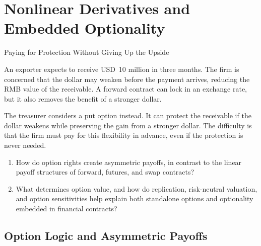 \chapter{Nonlinear Derivatives and Embedded Optionality}
\label{chap:Nonlinear_Derivatives_and_Embedded_Optionality}

\begin{openingcase}{Paying for Protection Without Giving Up the Upside}

An exporter expects to receive USD~10 million in three months. The firm is concerned that the dollar may weaken before the payment arrives, reducing the RMB value of the receivable. A forward contract can lock in an exchange rate, but it also removes the benefit of a stronger dollar.

The treasurer considers a put option instead. It can protect the receivable if the dollar weakens while preserving the gain from a stronger dollar. The difficulty is that the firm must pay for this flexibility in advance, even if the protection is never needed.

\end{openingcase}


\begin{tcolorbox}[
  enhanced,
  colback=FinanceBlue!6,
  colframe=FinanceBlue,
  boxrule=0.6pt,
  sharp corners,
  left=8pt,
  right=8pt,
  top=7pt,
  bottom=7pt,
  before skip=1em,
  after skip=1.6em,
  title=\textbf{Core Questions},
  coltitle=white,
  colbacktitle=FinanceBlue,
  fonttitle=\bfseries,
  attach boxed title to top left={xshift=6pt,yshift=-2mm},
  boxed title style={
    boxrule=0pt,
    sharp corners,
    left=5pt,
    right=5pt,
    top=2pt,
    bottom=2pt
  }
]
\begin{enumerate}[
  leftmargin=*,
  label=\textcolor{FinanceBlue}{\textbf{\arabic*.}},
  itemsep=0.55em,
  topsep=0.2em
]


\item How do option rights create asymmetric payoffs, in
contrast to the linear payoff structures of forward,
futures, and swap contracts?

\item What determines option value, and how do replication, risk-neutral valuation, and option sensitivities help explain both standalone options and optionality embedded in financial contracts?

\end{enumerate}
\end{tcolorbox}


\section{Option Logic and Asymmetric Payoffs}

